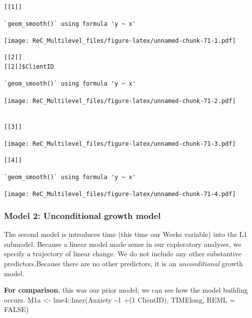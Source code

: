 \documentclass[
  11pt,
]{book}
\begin{document}
\begin{verbatim}
[[1]]
\end{verbatim}

\begin{verbatim}
`geom_smooth()` using formula 'y ~ x'
\end{verbatim}

\texttt{[image: ReC\_Multilevel\_files/figure-latex/unnamed-chunk-71-1.pdf]}

\begin{verbatim}
[[2]]
[[2]]$ClientID
\end{verbatim}

\begin{verbatim}
`geom_smooth()` using formula 'y ~ x'
\end{verbatim}

\texttt{[image: ReC\_Multilevel\_files/figure-latex/unnamed-chunk-71-2.pdf]}

\begin{verbatim}

[[3]]
\end{verbatim}

\texttt{[image: ReC\_Multilevel\_files/figure-latex/unnamed-chunk-71-3.pdf]}

\begin{verbatim}
[[4]]
\end{verbatim}

\begin{verbatim}
`geom_smooth()` using formula 'y ~ x'
\end{verbatim}

\texttt{[image: ReC\_Multilevel\_files/figure-latex/unnamed-chunk-71-4.pdf]}

\hypertarget{model-2-unconditional-growth-model}{%
\subsubsection{Model 2: Unconditional growth model}\label{model-2-unconditional-growth-model}}

The second model is introduces time (this time our Weeks variable) into the L1 submodel. Because a linear model made sense in our exploratory analyses, we specify a trajectory of linear change. We do not include any other substantive predictors.Because there are no other predictors, it is an \emph{unconditional} growth model.

\textbf{For comparison}, this was our prior model; we can see how the model building occurs.
M1a \textless- lme4::lmer(Anxiety \textasciitilde1 +(1 \textbar{} ClientID), TIMElong, REML = FALSE)
\end{document}

